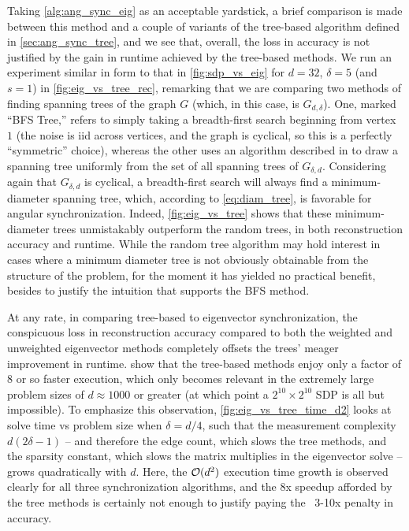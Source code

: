 Taking \cref{alg:ang_sync_eig} as an acceptable yardstick, a brief comparison is made between this method and a couple of variants of the tree-based algorithm defined in \cref{sec:ang_sync_tree}, and we see that, overall, the loss in accuracy is not justified by the gain in runtime achieved by the tree-based methods.  We run an experiment similar in form to that in \cref{fig:sdp_vs_eig} for $d = 32$, $\delta = 5$ (and $s = 1$) in \cref{fig:eig_vs_tree_rec}, remarking that we are comparing two methods of finding spanning trees of the graph $G$ (which, in this case, is $G_{d, \delta}$).  One, marked ``BFS Tree,'' refers to simply taking a breadth-first search beginning from vertex $1$ (the noise is iid across vertices, and the graph is cyclical, so this is a perfectly ``symmetric'' choice), whereas the other uses an algorithm described in \cite{wilson1996randtree} to draw a spanning tree uniformly from the set of all spanning trees of $G_{\delta, d}$.  Considering again that $G_{\delta, d}$ is cyclical, a breadth-first search will always find a minimum-diameter spanning tree, which, according to \eqref{eq:diam_tree}, is favorable for angular synchronization.  Indeed, \cref{fig:eig_vs_tree} shows that these minimum-diameter trees unmistakably outperform the random trees, in both reconstruction accuracy and runtime.  While the random tree algorithm may hold interest in cases where a minimum diameter tree is not obviously obtainable from the structure of the problem, for the moment it has yielded no practical benefit, besides to justify the intuition that supports the BFS method.

  At any rate, in comparing tree-based to eigenvector synchronization, the conspicuous loss in reconstruction accuracy compared to both the weighted and unweighted eigenvector methods completely offsets the trees' meager improvement in runtime.   show that the tree-based methods enjoy only a factor of 8 or so faster execution, which only becomes relevant in the extremely large problem sizes of $d \approx 1000$ or greater (at which point a $2^{10} \times 2^{10}$ SDP is all but impossible).  To emphasize this observation, \cref{fig:eig_vs_tree_time_d2} looks at solve time vs problem size when $\delta = d / 4$, such that the measurement complexity $d (2 \delta - 1)$ -- and therefore the edge count, which slows the tree methods, and the sparsity constant, which slows the matrix multiplies in the eigenvector solve -- grows quadratically with $d$.  Here, the $\mathcal{O}(d^2)$ execution time growth is observed clearly for all three synchronization algorithms, and the 8x speedup afforded by the tree methods is certainly not enough to justify paying the ~3-10x penalty in accuracy.

